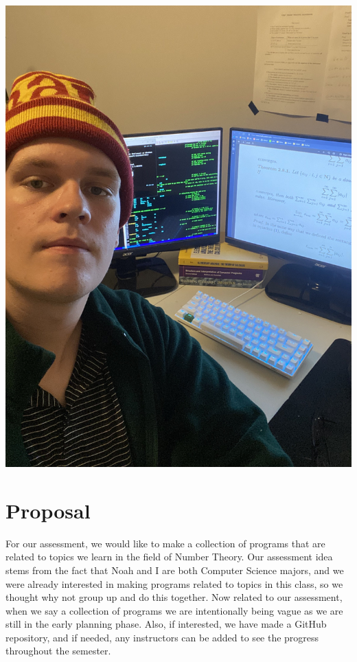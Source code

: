 \documentclass[11pt]{article}
\begin{document}
\begin{center}
\includegraphics[scale=0.07]{noah}
\end{center}
\newpage
\section*{Proposal}
For our assessment, we would like to make a collection of programs that are related to topics we learn in the field of Number Theory.
Our assessment idea stems from the fact that Noah and I are both Computer Science majors, and we were already interested in making programs related to topics in this class, so we thought why not group up and do this together.
Now related to our assessment, when we say a collection of programs we are intentionally being vague as we are still in the early planning phase.
Also, if interested, we have made a GitHub repository, and if needed, any instructors can be added to see the progress throughout the semester.
\end{document}
